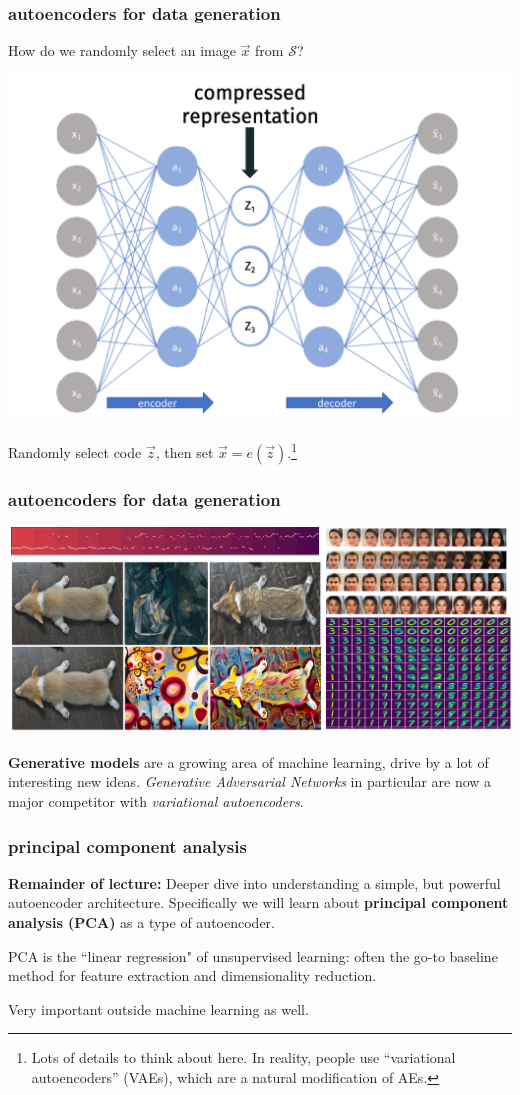 \documentclass[handout,compress]{beamer}
\begin{document}
\begin{frame}
	\frametitle{autoencoders for data generation}
	\small
	How do we randomly select an image $\vec{x}$ from $\mathcal{S}$? 
	\vspace{-.5em}
	\begin{center}
		\includegraphics[width=.5\textwidth]{compressed_rep.png}
	\end{center}
	\vspace{-.5em}
	Randomly select code $\vec{z}$, then set $\vec{x} = e(\vec{z}).$\footnote{Lots of details to think about here. In reality, people use ``variational autoencoders'' (VAEs), which are a  natural modification of AEs.}
\end{frame}

\begin{frame}
	\frametitle{autoencoders for data generation}
	\small
	\begin{center}
		\includegraphics[width=\textwidth]{data_generation.png}
	\end{center}
	\textbf{\alert{Generative models}} are a growing area of machine learning, drive by a lot of interesting new ideas. \emph{Generative Adversarial Networks} in particular are now a major competitor with \emph{variational autoencoders}.
\end{frame}

\begin{frame}
	\frametitle{principal component analysis}
	\textbf{Remainder of lecture:} Deeper dive into understanding a simple, but powerful autoencoder architecture. Specifically we will learn about \textbf{\alert{principal component analysis (PCA)}}  as a type of autoencoder.
	
	PCA is the ``linear regression" of unsupervised learning: often the go-to baseline method for feature extraction and dimensionality reduction.
	
	Very important outside machine learning as well.
\end{frame}
\end{document}
